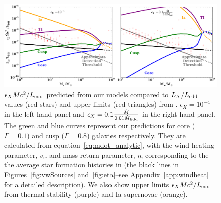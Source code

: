 \documentclass[usenatbib,fleqn]{mn2e}
\newcommand{\Mdot}{\dot{M}}
\newcommand{\eddr}{\dot{M}/\dot{M}_{\rm Edd}}
\newcommand{\MdotEdd}{\dot{M}_{\rm Edd}}
\newcommand{\vwO}{v_{w}}
\begin{document}
\begin{figure}
\includegraphics[width=\textwidth]{miller.pdf}
\caption{\label{fig:miller} $\epsilon_X \Mdot c^2/L_{\rm edd}$ predicted
  from our models compared to $L_X/L_{\rm edd}$ values (red stars) and
  upper limits (red triangles) from \citet{Miller+15}.
  $\epsilon_X=10^{-4}$ in the left-hand panel and $\epsilon_X=0.1
  \frac{\Mdot}{0.01 \MdotEdd}$ in the right-hand panel. The green and
  blue curves represent our predictions for core ($\Gamma=0.1$)
  and cusp ($\Gamma=0.8$) galaxies respectively. They are calculated
  from equation~\eqref{eq:mdot_analytic}, with the wind heating
  parameter, $v_w$ and mass return parameter, $\eta$, corresponding to
  the the average star formation histories in
  \citet{MosterNaab+:2013a} (the black lines in
  Figures~\ref{fig:vwSources} and~\ref{fig:eta}--see
  Appendix~\ref{app:windheat} for a detailed description).
  We also show upper limits $\epsilon_X \Mdot c^2/L_{\rm edd}$ from
  thermal stability (purple) and Ia supernovae (orange).}
\end{figure}


\end{document}
